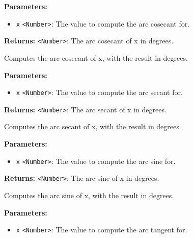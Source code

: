 \documentclass[12pt,a4paper]{article}
\begin{document}
\noindent \textbf{Parameters:}
\begin{itemize}
  \item \texttt{x} \texttt{<Number>}: The value to compute the arc cosecant for.
\end{itemize}

\noindent \textbf{Returns:} \texttt{<Number>}: The arc cosecant of x in degrees.

\noindent Computes the arc cosecant of x, with the result in degrees.

\vspace{5mm}
\noindent {}


\noindent \textbf{Parameters:}
\begin{itemize}
  \item \texttt{x} \texttt{<Number>}: The value to compute the arc secant for.
\end{itemize}

\noindent \textbf{Returns:} \texttt{<Number>}: The arc secant of x in degrees.

\noindent Computes the arc secant of x, with the result in degrees.

\vspace{5mm}
\noindent {}


\noindent \textbf{Parameters:}
\begin{itemize}
  \item \texttt{x} \texttt{<Number>}: The value to compute the arc sine for.
\end{itemize}

\noindent \textbf{Returns:} \texttt{<Number>}: The arc sine of x in degrees.

\noindent Computes the arc sine of x, with the result in degrees.

\vspace{5mm}
\noindent {}


\noindent \textbf{Parameters:}
\begin{itemize}
  \item \texttt{x} \texttt{<Number>}: The value to compute the arc tangent for.
\end{itemize}
\end{document}
